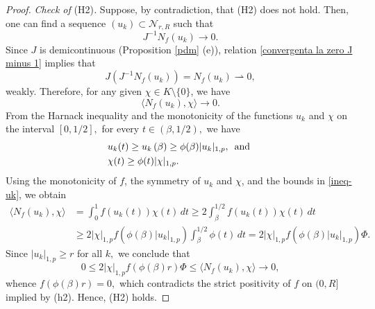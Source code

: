 \documentclass{birkjour}
\theoremstyle{definition}
\theoremstyle{remark}
\numberwithin{equation}{section}
\begin{document}
\begin{proof}
\textit{Check of }(H2)\textit{.} Suppose, by contradiction, that (H2) does
not hold. Then, one can find a sequence $(u_{k})\subset \mathcal{N}_{r,R}$
such that
\begin{equation}
J^{-1}N_{f}\left( u_{k}\right) \rightarrow 0.
\label{convergenta la zero J minus 1}
\end{equation}%
Since $J$ is demicontinuous (Proposition \ref{pdm} (e)), relation
\eqref{convergenta la zero
J minus 1} implies that
\begin{equation*}
J(J^{-1}N_{f}\left( u_{k}\right) )=N_{f}\left( u_{k}\right) \rightharpoonup
0,
\end{equation*}%
weakly. Therefore, for any given $\chi \in K\setminus \{0\}$, we have
\begin{equation*}
\langle N_{f}\left( u_{k}\right) ,\chi \rangle \rightarrow 0.
\end{equation*}%
From the Harnack inequality and the monotonicity of the functions $u_{k}$
and $\chi $ on the interval $\left[ 0,1/2\right] ,$ for every $t\in (\beta
,1/2),$ we have
\begin{align}
& u_{k}(t)\geq u_{k}\left( \beta \right) \geq \phi (\beta )|u_{k}|_{1,p},\,%
\text{ and }  \notag \\
& \chi (t)\geq \phi (t)|\chi |_{1,p}.  \label{ineq-uk}
\end{align}%
Using the monotonicity of $f$, the symmetry of $u_{k}$ and $\chi $, and the
bounds in \eqref{ineq-uk}, we obtain
\begin{align*}
\langle N_{f}\left( u_{k}\right) ,\chi \rangle &
=\int_{0}^{1}f(u_{k}(t))\chi (t)\,dt\geq 2\int_{\beta }^{1/2}f\left(
u_{k}(t)\right) \chi (t)\,dt \\
& \geq 2|\chi |_{1,p}f(\phi (\beta )|u_{k}|_{1,p})\int_{\beta }^{1/2}\phi
(t)\,dt=2|\chi |_{1,p}f(\phi (\beta )|u_{k}|_{1,p})\Phi .
\end{align*}%
Since $\left\vert u_{k}\right\vert _{1,p}\geq r$ for all $k,$ we conclude
that
\begin{equation*}
0\leq 2|\chi |_{1,p}f(\phi (\beta )r)\Phi \leq \langle N_{f}\left(
u_{k}\right) ,\chi \rangle \rightarrow 0,
\end{equation*}%
whence $f(\phi (\beta )r)=0,$ which contradicts the strict positivity of $f$
on $(0,R]$ implied by (h2). Hence, (H2) holds.


\end{proof}
\end{document}
